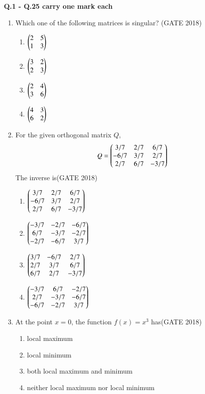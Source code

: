 \documentclass[journal,12pt,onecolumn]{IEEEtran}
\theoremstyle{remark}
\begin{document}
\newpage
\textbf{\large Q.1 - Q.25 carry one mark each}
\begin{enumerate}
  \vspace{1cm}
\item Which one of the following matrices is singular?
\hfill{(GATE 2018)}
\begin{multicols}{4}
\begin{enumerate}
    \item $\begin{pmatrix} 2 & 5 \\ 1 & 3 \end{pmatrix}$
    \item $\begin{pmatrix} 3 & 2 \\ 2 & 3 \end{pmatrix}$
    \item $\begin{pmatrix} 2 & 4 \\ 3 & 6 \end{pmatrix}$
    \item $\begin{pmatrix} 4 & 3 \\ 6 & 2 \end{pmatrix}$
\end{enumerate}
\end{multicols}
\vspace{1cm}

\item For the given orthogonal matrix $Q$,
\[
Q =
\begin{pmatrix}
3/7 & 2/7 & 6/7 \\
-6/7 & 3/7 & 2/7 \\
2/7 & 6/7 & -3/7
\end{pmatrix}
\]
The inverse is\hfill{(GATE 2018)}
\begin{multicols}{4}
\begin{enumerate}
    \item
    $\begin{pmatrix}
    3/7 & 2/7 & 6/7 \\
    -6/7 & 3/7 & 2/7 \\
    2/7 & 6/7 & -3/7
    \end{pmatrix}$
    \item
    $\begin{pmatrix}
    -3/7 & -2/7 & -6/7 \\
    6/7 & -3/7 & -2/7 \\
    -2/7 & -6/7 & 3/7
    \end{pmatrix}$
    \item
    $\begin{pmatrix}
    3/7 & -6/7 & 2/7 \\
    2/7 & 3/7 & 6/7 \\
    6/7 & 2/7 & -3/7
    \end{pmatrix}$
    \item
    $\begin{pmatrix}
    -3/7 & 6/7 & -2/7 \\
    2/7 & -3/7 & -6/7 \\
    -6/7 & -2/7 & 3/7
    \end{pmatrix}$
\end{enumerate}
\end{multicols}
\vspace{1cm}

\item At the point $x=0$, the function $f(x)=x^3$ has\hfill{(GATE 2018)}
\begin{multicols}{4}
\begin{enumerate}
    \item local maximum
    \item local minimum
    \item both local maximum and minimum
    \item neither local maximum nor local minimum
\end{enumerate}
\end{multicols}
\vspace{1cm}


\end{enumerate}
\end{document}
